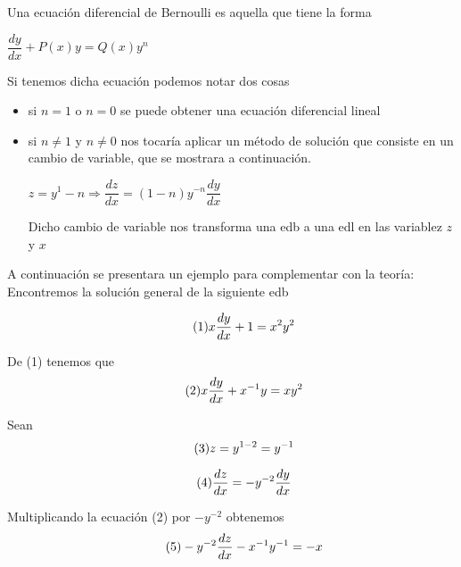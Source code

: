 \documentclass[10pt,a4paper]{article}
\begin{document}
  Una ecuación diferencial de Bernoulli es aquella que tiene la forma\\
\begin{center}
$\dfrac{dy}{dx}+P(x)y=Q(x)y^n$
\end{center}
Si tenemos dicha ecuación podemos notar dos cosas
\begin{itemize}
\item si $n=1$ o $n=0$ se puede obtener una ecuación diferencial lineal\\
\item si $n\neq1$ y $n\neq0$ nos tocaría aplicar un método de solución que consiste en un cambio de variable, que se mostrara a continuación.\\
\begin{center}
 $z=y^1-n\Rightarrow\dfrac{dz}{dx}=(1-n)y^{-n}\dfrac{dy}{dx}$\\
  
\end{center}
Dicho cambio de variable nos transforma una edb a una edl en las variablez $z$ y $x$\\

\end{itemize}
A continuación se presentara un ejemplo para complementar con la teoría:\\
Encontremos la solución general de la siguiente edb

\begin{equation}\tag{1}
x\dfrac{dy}{dx}+1=x^2y^2\\
\end{equation}

De (1) tenemos que
\begin{equation}\tag{2}
x\dfrac{dy}{dx}+x^{-1}y=xy^2\\
\end{equation}

Sean
\begin{equation}\tag{3}
z=y^{1-2}=y^{-1}\\
\end{equation}

\begin{equation}\tag{4}
\dfrac{dz}{dx}=-y^{-2}\dfrac{dy}{dx}\\
\end{equation}

Multiplicando la ecuación (2) por $-y^{-2}$ obtenemos
\begin{equation}\tag{5}
-y^{-2}\dfrac{dz}{dx}-x^{-1}y^{-1}=-x\\
\end{equation}
\end{document}
